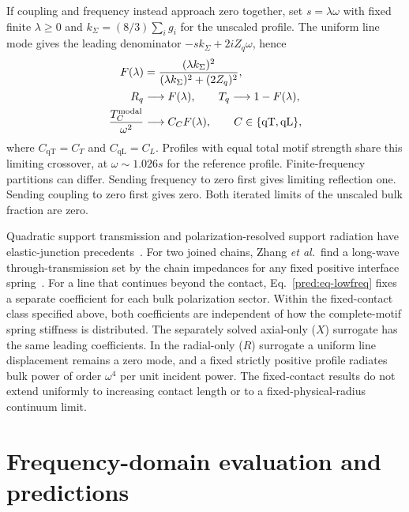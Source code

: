 \documentclass[10pt,aps,onecolumn,floatfix,notitlepage,nofootinbib,showkeys]{revtex4-2}
\newcommand{\qT}{\mathrm{qT}}
\newcommand{\qL}{\mathrm{qL}}
\begin{document}
If coupling and frequency instead approach zero together, set $s=\lambda\omega$ with fixed finite $\lambda\geq0$ and $k_\Sigma=(8/3)\sum_i g_i$ for the unscaled profile. The uniform line mode gives the leading denominator $-s k_\Sigma+2iZ_q\omega$, hence
\begin{align}
 F(\lambda)&=\frac{(\lambda k_\Sigma)^2}
 {(\lambda k_\Sigma)^2+(2Z_q)^2},\nonumber\\
 R_q&\longrightarrow F(\lambda),\qquad
 T_q\longrightarrow1-F(\lambda),\nonumber\\
 \frac{T_{C}^{\rm modal}}{\omega^2}&\longrightarrow C_C F(\lambda),
 \qquad C\in\{\qT,\qL\},
 \label{pred:eq-crossover}
\end{align}
where $C_{\qT}=C_T$ and $C_{\qL}=C_L$. Profiles with equal total motif strength share this limiting crossover, at $\omega\sim1.026s$ for the reference profile. Finite-frequency partitions can differ. Sending frequency to zero first gives limiting reflection one. Sending coupling to zero first gives zero. Both iterated limits of the unscaled bulk fraction are zero.

Quadratic support transmission and polarization-resolved support radiation have elastic-junction precedents~\cite{ChangGeller2005,WilsonRae2008}. For two joined chains, Zhang \textit{et al.}\ find a long-wave through-transmission set by the chain impedances for any fixed positive interface spring~\cite{ZhangEtAl2011}. For a line that continues beyond the contact, Eq.~\eqref{pred:eq-lowfreq} fixes a separate coefficient for each bulk polarization sector. Within the fixed-contact class specified above, both coefficients are independent of how the complete-motif spring stiffness is distributed. The separately solved axial-only ($X$) surrogate has the same leading coefficients. In the radial-only ($R$) surrogate a uniform line displacement remains a zero mode, and a fixed strictly positive profile radiates bulk power of order $\omega^4$ per unit incident power. The fixed-contact results do not extend uniformly to increasing contact length or to a fixed-physical-radius continuum limit.

\section{Frequency-domain evaluation and predictions}
\label{sec:s6-frequency}
\end{document}

